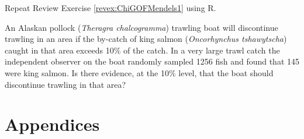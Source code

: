 \documentclass[10pt,openany]{book}\usepackage[]{graphicx}\usepackage[]{color}
\begin{document}
\begin{exsection}
  \item \label{revex:ChiGOFMendels1R} \rhw{} Repeat Review Exercise \ref{revex:ChiGOFMendels1} using R. 

  \item \label{revex:ChiGOFByCatch} \rhw{} An Alaskan pollock (\textit{Theragra chalcogramma}) trawling boat will discontinue trawling in an area if the by-catch of king salmon (\textit{Oncorhynchus tshawytscha}) caught in that area exceeds 10\% of the catch.  In a very large trawl catch the independent observer on the boat randomly sampled 1256 fish and found that 145 were king salmon.  Is there evidence, at the 10\% level, that the boat should discontinue trawling in that area? 
\end{exsection}

    \cleardoublepage
    \chapter*{Appendices}
    \appendix



  \backmatter
    
\end{document}
